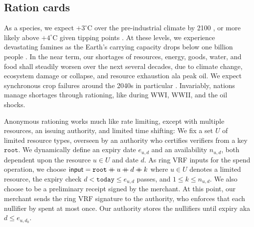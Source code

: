 \subsection{Ration cards}
\label{subsec:app_ration_carts}

As a species, we expect $+3^{\circ}$C over the pre-industrial climate
by 2100 \cite{IPCC2022}, or more likely above $+4^{\circ}$C given
tipping points \cite{tipping2022}.  %
At these levels, we experience devastating famines as the Earth's
carrying capacity drops below one billion people \cite{carrying_capacity}.
In the near term, our shortages of resources, energy, goods, water,
and food shall steadily worsen over the next several decades, due to
climate change, ecosystem damage or collapse, and resource exhaustion
ala peak oil.  We expect synchronous crop failures around the 2040s
in particular \cite{climaterisk2021}. %
Invariably, nations manage shortages through rationing, like during WWI, WWII, and the oil shocks.  

Anonymous rationing works much like rate limiting, except with
 multiple resources, an issuing authority, and limited time shifting:
%
\def\expiry{e}
We fix a set $U$ of limited resource types, overseen by
an authority who certifies verifiers from a key $\mathtt{root}$.
We dynamically define an expiry date $\expiry_{u,d}$ and an availability $n_{u,d}$,
both dependent upon the resource $u \in U$ and date $d$.
As ring VRF inputs for the spend operation, we choose
$\mathsf{input} = \mathtt{root} \mathbin{+\mkern-10mu+} u \mathbin{+\mkern-10mu+} d \mathbin{+\mkern-10mu+} k$
where $u \in U$ denotes a limited resource,
the expiry check $d < \mathtt{today} \le \expiry_{u,d}$ passes,
and $1 \le k \le n_{u,d}$.
We also choose \aux to be a preliminary receipt signed by the merchant.
%
At this point, our merchant sends the ring VRF signature to the authority,
who enforces that each nullifier by spent at most once.
Our authority stores the nullifiers until expiry aka $d \le \expiry_{u,d_0}$.



